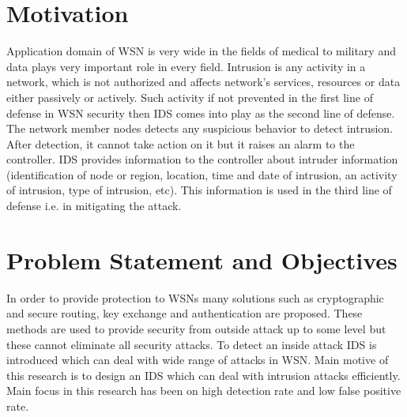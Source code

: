 \section{Motivation}
Application domain of WSN is very wide in the fields of medical to military and data plays very important role in every field. Intrusion is any activity in a network, which is not authorized and affects network's services, resources or data either passively or actively. Such activity if not prevented in the first line of defense in WSN security then IDS comes into play as the second line of defense. The network member nodes detects any suspicious behavior to detect intrusion. After detection, it cannot take action on it but it raises an alarm to the controller. IDS provides information to the controller about intruder information (identification of node or region, location, time and date of intrusion, an activity of intrusion, type of intrusion, etc). This information is used in the third line of defense i.e. in mitigating the attack.

\section{Problem Statement and Objectives}
In order to provide protection to WSNs many solutions such as cryptographic and secure routing, key exchange and authentication are proposed. These methods are used to provide security from outside attack up to some level but these cannot eliminate all security attacks. To detect an inside attack IDS is introduced which can deal with wide range of attacks in WSN. Main motive of this research is to design an IDS which can deal with intrusion attacks efficiently. Main focus in this research has been on high detection rate and low false positive rate.
